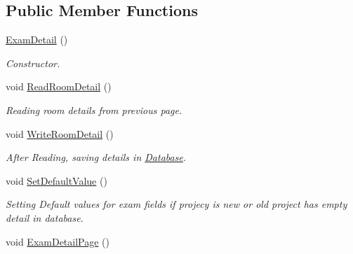 \subsection*{Public Member Functions}
\begin{DoxyCompactItemize}
\item 
\hypertarget{classExamDetail_ad555c8a79c821f4e9e75c9b882366991}{\hyperlink{classExamDetail_ad555c8a79c821f4e9e75c9b882366991}{Exam\-Detail} ()}\label{classExamDetail_ad555c8a79c821f4e9e75c9b882366991}

\begin{DoxyCompactList}\small\item\em Constructor. \end{DoxyCompactList}\item 
\hypertarget{classExamDetail_a460c5736a52aa73ee2627a322d9022f8}{void \hyperlink{classExamDetail_a460c5736a52aa73ee2627a322d9022f8}{Read\-Room\-Detail} ()}\label{classExamDetail_a460c5736a52aa73ee2627a322d9022f8}

\begin{DoxyCompactList}\small\item\em Reading room details from previous page. \end{DoxyCompactList}\item 
\hypertarget{classExamDetail_a51cb1af0e7d6f077aa662b120fd7aec2}{void \hyperlink{classExamDetail_a51cb1af0e7d6f077aa662b120fd7aec2}{Write\-Room\-Detail} ()}\label{classExamDetail_a51cb1af0e7d6f077aa662b120fd7aec2}

\begin{DoxyCompactList}\small\item\em After Reading, saving details in \hyperlink{classDatabase}{Database}. \end{DoxyCompactList}\item 
\hypertarget{classExamDetail_a3f17d1b2a87cf9530ce2dc5c65244165}{void \hyperlink{classExamDetail_a3f17d1b2a87cf9530ce2dc5c65244165}{Set\-Default\-Value} ()}\label{classExamDetail_a3f17d1b2a87cf9530ce2dc5c65244165}

\begin{DoxyCompactList}\small\item\em Setting Default values for exam fields if projecy is new or old project has empty detail in database. \end{DoxyCompactList}\item 
\hypertarget{classExamDetail_aa5bccd1f578e6149ad212206e95d9d57}{void \hyperlink{classExamDetail_aa5bccd1f578e6149ad212206e95d9d57}{Exam\-Detail\-Page} ()}\label{classExamDetail_aa5bccd1f578e6149ad212206e95d9d57}


\end{DoxyCompactItemize}

